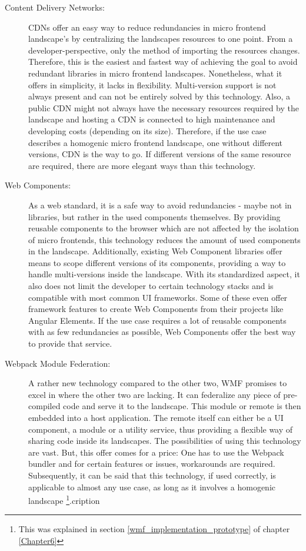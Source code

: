 \begin{description}
	\item[Content Delivery Networks:] CDNs offer an easy way to reduce redundancies in micro frontend landscape's by centralizing the landscapes resources to one point. 
	From a developer-perspective, only the method of importing the resources changes. 
	Therefore, this is the easiest and fastest way of achieving the goal to avoid redundant libraries in micro frontend landscapes. 
	Nonetheless, what it offers in simplicity, it lacks in flexibility. 
	Multi-version support is not always present and can not be entirely solved by this technology. 
	Also, a public CDN might not always have the necessary resources required by the landscape and hosting a CDN is connected to high maintenance and developing costs (depending on its size). 
	Therefore, if the use case describes a homogenic micro frontend landscape, one without different versions, CDN is the way to go. 
	If different versions of the same resource are required, there are more elegant ways than this technology.
	
	\item[Web Components:] As a web standard, it is a safe way to avoid redundancies - maybe not in libraries, but rather in the used components themselves. 
	By providing reusable components to the browser which are not affected by the isolation of micro frontends, this technology reduces the amount of used components in the landscape. 
	Additionally, existing Web Component libraries offer means to scope different versions of its components, providing a way to handle multi-versions inside the landscape. 
	With its standardized aspect, it also does not limit the developer to certain technology stacks and is compatible with most common UI frameworks. 
	Some of these even offer framework features to create Web Components from their projects like Angular Elements. 
	If the use case requires a lot of reusable components with as few redundancies as possible, Web Components offer the best way to provide that service.
	
	\item[Webpack Module Federation:] A rather new technology compared to the other two, WMF promises to excel in where the other two are lacking. 
	It can federalize any piece of pre-compiled code and serve it to the landscape. 
	This module or remote is then embedded into a host application. 
	The remote itself can either be a UI component, a module or a utility service, thus providing a flexible way of sharing code inside its landscapes. 
	The possibilities of using this technology are vast. 
	But, this offer comes for a price: One has to use the Webpack bundler and for certain features or issues, workarounds are required. 
	Subsequently, it can be said that this technology, if used correctly, is applicable to almost any use case, as long as it involves a homogenic landscape \footnote{This was explained in section \ref{wmf_implementation_prototype} of chapter \ref{Chapter6}}.cription
\end{description}

